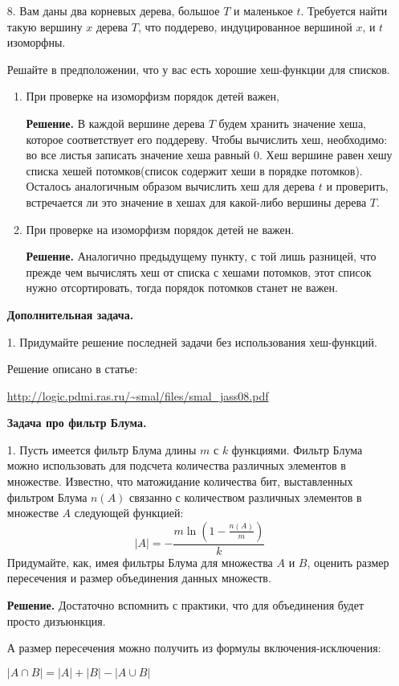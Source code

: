 \begin{enumerate}
	\item[8.] Вам даны два корневых дерева, большое $T$ и маленькое $t$. Требуется найти такую вершину $x$
	дерева $T$, что поддерево, индуцированное вершиной $x$, и $t$ изоморфны.
	
	Решайте в предположении, что у вас есть хорошие хеш-функции для списков.
	
	\begin{enumerate}
		\item При проверке на изоморфизм порядок детей важен,
		
		\textbf{Решение.} В каждой вершине дерева $T$ будем хранить значение хеша, которое соответствует его 
		поддереву. Чтобы вычислить хеш, необходимо: во все листья записать значение хеша равный $0$. Хеш вершине 
		равен хешу списка хешей потомков(список содержит хеши в порядке потомков). Осталось аналогичным образом 
		вычислить хеш для дерева $t$ и проверить, встречается ли это значение в хешах для какой-либо вершины 
		дерева $T$. 
		
		\item При проверке на изоморфизм порядок детей не важен.
		
		\textbf{Решение.} Аналогично предыдущему пункту, с той лишь разницей, что прежде чем вычислять хеш от 
		списка с хешами потомков, этот список нужно отсортировать, тогда порядок потомков станет не важен. 
	\end{enumerate}
	
	\textbf{Дополнительная задача.}
	
	\item[1.] Придумайте решение последней задачи без использования хеш-функций.
	
	Решение описано в статье:
	
	\url{http://logic.pdmi.ras.ru/~smal/files/smal_jass08.pdf}
	
	\textbf{Задача про фильтр Блума.}
	
	\item[1.] Пусть имеется фильтр Блума длины $m$ с $k$ функциями. Фильтр Блума можно использовать для подсчета количества 
	различных элементов в множестве. Известно, что матожидание количества бит, выставленных фильтром Блума $n(A)$ 
	связанно с количеством различных элементов в множестве $A$ следующей функцией:
	\begin{equation}
		|A| = - \dfrac{m \ln (1-\frac{n(A)}{m})}{k}
	\end{equation}
	Придумайте, как, имея фильтры Блума для множества $A$ и $B$, оценить размер пересечения и размер объединения 
	данных множеств.
	
	\textbf{Решение.} Достаточно вспомнить с практики, что для объединения будет просто дизъюнкция. 
	
	А размер пересечения можно получить из формулы включения-исключения:
	
	$|A \cap B| = |A| + |B| - |A \cup B|$
	
\end{enumerate}


